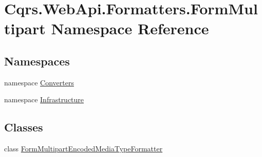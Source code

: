\hypertarget{namespaceCqrs_1_1WebApi_1_1Formatters_1_1FormMultipart}{}\section{Cqrs.\+Web\+Api.\+Formatters.\+Form\+Multipart Namespace Reference}
\label{namespaceCqrs_1_1WebApi_1_1Formatters_1_1FormMultipart}
\subsection*{Namespaces}
\begin{DoxyCompactItemize}
\item 
namespace \hyperlink{namespaceCqrs_1_1WebApi_1_1Formatters_1_1FormMultipart_1_1Converters}{Converters}
\item 
namespace \hyperlink{namespaceCqrs_1_1WebApi_1_1Formatters_1_1FormMultipart_1_1Infrastructure}{Infrastructure}
\end{DoxyCompactItemize}
\subsection*{Classes}
\begin{DoxyCompactItemize}
\item 
class \hyperlink{classCqrs_1_1WebApi_1_1Formatters_1_1FormMultipart_1_1FormMultipartEncodedMediaTypeFormatter}{Form\+Multipart\+Encoded\+Media\+Type\+Formatter}
\end{DoxyCompactItemize}
